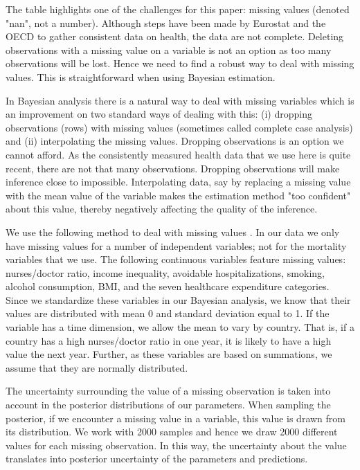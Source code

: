 \documentclass[12pt,english,a4paper]{article}
\begin{document}
The table highlights one of the challenges for this paper: missing values (denoted "nan", not a number). Although steps have been made by Eurostat and the OECD to gather consistent data on health, the data are not complete. Deleting observations with a missing value on a variable is not an option as too many observations will be lost. Hence we need to find a robust way to deal with missing values. This is straightforward when using Bayesian estimation.

In Bayesian analysis there is a natural way to deal with missing variables which is an improvement on two standard ways of dealing with this: (i) dropping observations (rows) with missing values (sometimes called complete case analysis) and (ii) interpolating the missing values. Dropping observations is an option we cannot afford. As the consistently measured health data that we use here is quite recent, there are not that many observations. Dropping observations will make inference close to impossible. Interpolating data, say by replacing a missing value with the mean value of the variable makes the estimation method "too confident" about this value, thereby negatively affecting the quality of the inference.

We use the following method to deal with missing values \citep{mcelreath}. In our data we only have missing values for a number of independent variables; not for the mortality variables that we use. The following continuous variables feature missing values: nurses/doctor ratio, income inequality, avoidable hospitalizations, smoking, alcohol consumption, BMI, and the seven healthcare expenditure categories. Since we standardize these variables in our Bayesian analysis, we know that their values are distributed with mean 0 and standard deviation equal to 1. If the variable has a time dimension, we allow the mean to vary by country. That is, if a country has a high nurses/doctor ratio in one year, it is likely to have a high value the next year. Further, as these variables are based on summations, we assume that they are normally distributed.

The uncertainty surrounding the value of a missing observation is taken into account in the posterior distributions of our parameters. When sampling the posterior, if we encounter a missing value in a variable, this value is drawn from its distribution. We work with 2000 samples and hence we draw 2000 different values for each missing observation. In this way, the uncertainty about the value translates into posterior uncertainty of the parameters and predictions.
\end{document}
